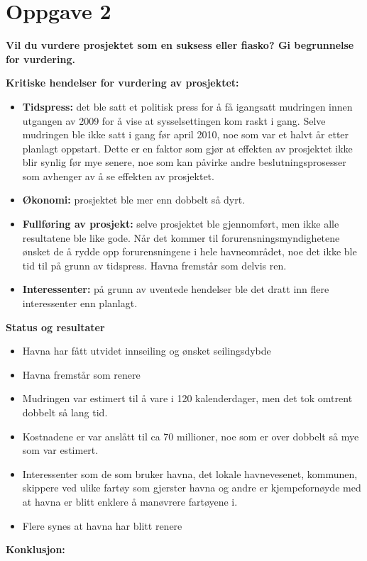 \section{Oppgave 2}

{\bf Vil du vurdere prosjektet som en suksess eller fiasko? 
Gi begrunnelse for vurdering.}

{\bf Kritiske hendelser for vurdering av prosjektet:}

	\begin{itemize}
		\item {\bf Tidspress:} det ble satt et politisk press for å få
		igangsatt mudringen innen utgangen av 2009 for å vise at sysselsettingen 
		kom raskt i gang. Selve mudringen ble ikke satt i gang før april 2010, noe
		som var et halvt år etter planlagt oppstart. Dette er en faktor som gjør
		at effekten av prosjektet ikke blir synlig før mye senere, noe som kan påvirke
		andre beslutningsprosesser som avhenger av å se effekten av prosjektet.
		\item {\bf Økonomi:} prosjektet ble mer enn dobbelt så dyrt. 
		\item {\bf Fullføring av prosjekt:} selve prosjektet ble gjennomført, men 
		ikke alle resultatene ble like gode. Når det kommer til forurensningsmyndighetene
		ønsket de å rydde opp forurensningene i hele havneområdet, noe det ikke ble tid til
		på grunn av tidspress. Havna fremstår som delvis ren.
		\item {\bf Interessenter:} på grunn av uventede hendelser ble det dratt inn
		flere interessenter enn planlagt. 
	\end{itemize}

{\bf Status og resultater}
	\begin{itemize}
		\item {Havna har fått utvidet innseiling og ønsket seilingsdybde}
		\item Havna fremstår som renere
		\item Mudringen var estimert til å vare i 120 kalenderdager, men det tok omtrent dobbelt
		så lang tid.
		\item Kostnadene er var anslått til ca 70 millioner, noe som er over dobbelt så mye som var 
		estimert. 
		\item Interessenter som de som bruker havna, det lokale havnevesenet, kommunen, skippere
		ved ulike fartøy som gjerster havna og andre er kjempefornøyde med at havna er blitt enklere
		å manøvrere fartøyene i.
		\item Flere synes at havna har blitt renere
	\end{itemize}

{\bf Konklusjon:}

	
